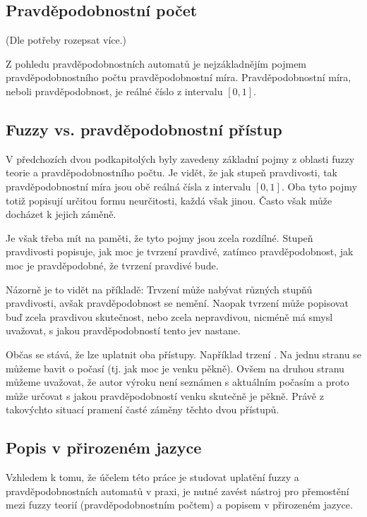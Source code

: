 \documentclass[a4paper,10pt]{article}
\begin{document}
\subsection{Pravděpodobnostní počet}
(Dle potřeby rozepsat více.) 

Z pohledu pravděpodobnostních automatů je nejzákladnějím pojmem pravděpodobnostního počtu pravděpodobnostní míra. Pravděpodobnostní míra, neboli pravděpodobnost, je reálné číslo z intervalu $[0, 1]$.  


\subsection{Fuzzy vs. pravděpodobnostní přístup} \label{subsec:FuzzyVsProb}
V předchozích dvou podkapitolých byly zavedeny základní pojmy z oblasti fuzzy teorie a pravděpodobnostního počtu. Je vidět, že jak stupeň pravdivosti, tak pravděpodobnostní míra jsou obě reálná čísla z intervalu $[0, 1]$. Oba tyto pojmy totiž popisují určitou formu neurčitosti, každá však jinou. Často však může docházet k jejich záměně.

Je však třeba mít na paměti, že tyto pojmy jsou zcela rozdílné. Stupeň pravdivosti popisuje, jak moc je tvrzení pravdivé, zatímco pravděpodobnost, jak moc je pravděpodobné, že tvrzení pravdivé bude.

Názorně je to vidět na příkladě: Trvzení  může nabývat různých stupňů pravdivosti, avšak pravděpodobnost se nemění. Naopak tvrzení  může popisovat buď zcela pravdivou skutečnost, nebo zcela nepravdivou, nicméně má smysl uvažovat, s jakou pravděpodobností tento jev nastane.

Občas se stává, že lze uplatnit oba přístupy. Například trzení . Na jednu stranu se můžeme bavit o  počasí (tj. jak moc je venku pěkně). Ovšem na druhou stranu můžeme uvažovat, že autor výroku není seznámen s aktuálním počasím a proto může určovat s jakou pravděpodobností venku skutečně je pěkně. Právě z takovýchto situací pramení časté záměny těchto dvou přístupů.

\subsection{Popis v přirozeném jazyce}
Vzhledem k tomu, že účelem této práce je studovat uplatění fuzzy a pravděpodobnostních automatů v praxi, je nutné zavést nástroj pro přemostění  mezi fuzzy teorií (pravděpodobnostním počtem) a popisem v přirozeném jazyce.
\end{document}
